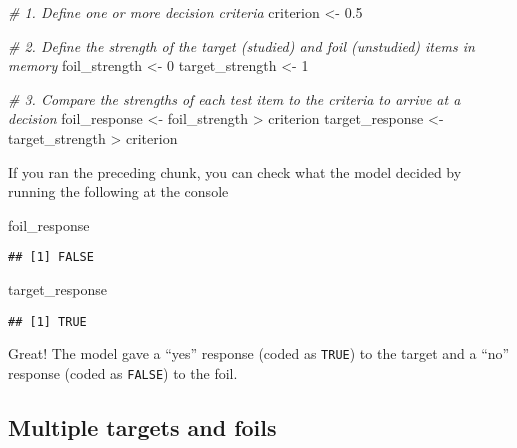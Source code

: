 \documentclass[
]{book}
\newenvironment{Shaded}{\begin{snugshade}}{\end{snugshade}}
\newcommand{\CommentTok}[1]{\textcolor[rgb]{0.56,0.35,0.01}{\textit{#1}}}
\newcommand{\DecValTok}[1]{\textcolor[rgb]{0.00,0.00,0.81}{#1}}
\newcommand{\FloatTok}[1]{\textcolor[rgb]{0.00,0.00,0.81}{#1}}
\newcommand{\NormalTok}[1]{#1}
\newcommand{\OtherTok}[1]{\textcolor[rgb]{0.56,0.35,0.01}{#1}}
\newcommand{\SpecialCharTok}[1]{\textcolor[rgb]{0.00,0.00,0.00}{#1}}
\begin{document}
\begin{Shaded}
\begin{Highlighting}[]
\CommentTok{\# 1. Define one or more decision criteria}
\NormalTok{criterion }\OtherTok{\textless{}{-}} \FloatTok{0.5}

\CommentTok{\# 2. Define the strength of the target (studied) and foil (unstudied) items in memory}
\NormalTok{foil\_strength }\OtherTok{\textless{}{-}} \DecValTok{0}
\NormalTok{target\_strength }\OtherTok{\textless{}{-}} \DecValTok{1}

\CommentTok{\# 3. Compare the strengths of each test item to the criteria to arrive at a decision}
\NormalTok{foil\_response }\OtherTok{\textless{}{-}}\NormalTok{ foil\_strength }\SpecialCharTok{\textgreater{}}\NormalTok{ criterion}
\NormalTok{target\_response }\OtherTok{\textless{}{-}}\NormalTok{ target\_strength }\SpecialCharTok{\textgreater{}}\NormalTok{ criterion}
\end{Highlighting}
\end{Shaded}

If you ran the preceding chunk, you can check what the model decided by running the following at the console

\begin{Shaded}
\begin{Highlighting}[]
\NormalTok{foil\_response}
\end{Highlighting}
\end{Shaded}

\begin{verbatim}
## [1] FALSE
\end{verbatim}

\begin{Shaded}
\begin{Highlighting}[]
\NormalTok{target\_response}
\end{Highlighting}
\end{Shaded}

\begin{verbatim}
## [1] TRUE
\end{verbatim}

Great! The model gave a ``yes'' response (coded as \texttt{TRUE}) to the target and a ``no'' response (coded as \texttt{FALSE}) to the foil.

\hypertarget{multiple-targets-and-foils}{%
\subsection{Multiple targets and foils}\label{multiple-targets-and-foils}}
\end{document}
